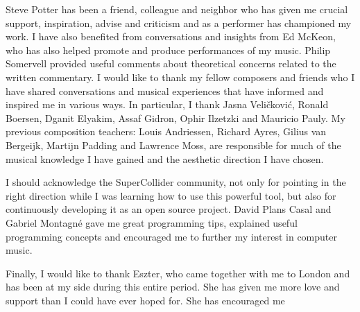 Steve Potter has been a friend, colleague and neighbor who has given me crucial support, inspiration, advise and criticism and as a performer has championed my work. I have also benefited from conversations and insights from Ed McKeon, who has also helped promote and produce performances of my music. Philip Somervell provided useful comments about theoretical concerns related to the written commentary. I would like to thank my fellow composers and friends who I have shared conversations and musical experiences that have informed and inspired me in various ways. In particular, I thank Jasna Veli\v{c}kovi\'{c}, Ronald Boersen, Dganit Elyakim, Assaf Gidron, Ophir Ilzetzki and Mauricio Pauly. My previous composition teachers: Louis Andriessen, Richard Ayres, Gilius van Bergeijk, Martijn Padding and Lawrence Moss, are responsible for much of the musical knowledge I have gained and the aesthetic direction I have chosen.

I should acknowledge the SuperCollider community, not only for pointing in the right direction while I was learning how to use this powerful tool, but also for continuously developing it as an open source project. David Plans Casal and Gabriel Montagn\'e gave me great programming tips, explained useful programming concepts and encouraged me to further my interest in computer music.

Finally, I would like to thank Eszter, who came together with me to London and has been at my side during this entire period. She has given me more love and support than I could have ever hoped for. She has encouraged me   
